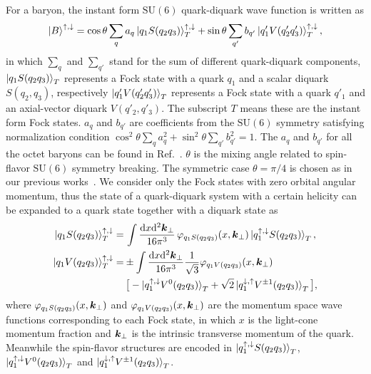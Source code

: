 \documentclass[aps,prc,preprint,groupedaddress,showpacs,superscriptaddress,floatfix]{revtex4-1}
\newcommand{\diff}{\ensuremath\mathrm{d}}
\renewcommand{\vec}[1]{\ensuremath\boldsymbol{#1}}
\newcommand{\udarrow}{\ensuremath{{\uparrow,\downarrow}}}
\newcommand{\duarrow}{\ensuremath{{\downarrow,\uparrow}}}
\begin{document}
For a baryon, the instant form $\mathrm{SU}(6)$ quark-diquark wave function is written as
%
\begin{equation}
  \Ket{B}^{\udarrow} = 
  \cos\theta \sum_q a_q \Ket{q_{1}S(q_{2}q_{3})}_T^{\udarrow}
  + \sin\theta \sum_{q'} b_{q'} \Ket{q'_{1}V(q'_{2}q'_{3})}_T^{\udarrow},
  \label{eq:quark_diquark}
\end{equation}
%
in which $\sum_q$ and $\sum_{q'}$ stand for the sum of different quark-diquark components, $\ket{q_1 S(q_2 q_3)}_T$ represents a Fock state with a quark $q_1$ and a scalar diquark $S(q_2, q_3)$, respectively $\ket{q'_1 V(q'_2 q'_3)}_T$ represents a Fock state with a quark $q'_1$ and an axial-vector diquark $V(q'_2, q'_3)$.
The subscript $T$ means these are the instant form Fock states.
$a_q$ and $b_{q'}$ are coefficients from the $\mathrm{SU}(6)$ symmetry satisfying normalization condition $\cos^2\theta \sum_q a_q^2 + \sin^2\theta \sum_{q'} b_{q'}^2 = 1$. 
The $a_q$ and $b_{q'}$ for all the octet baryons can be found in Ref.~\cite{lichtenberg_quark-diquark_1968}.
$\theta$ is the mixing angle related to spin-flavor $\mathrm{SU}(6)$ symmetry breaking.
The symmetric case $\theta=\pi/4$ is chosen as in our previous works~\cite{ma_x-dependent_1996,ma_quark_1998,ma_electromagnetic_2002,ma_axial_2002,liu_generalized_2014,lu_sivers_2004,liu_quark_2015}.
We consider only the Fock states with zero orbital angular momentum, thus the state of a quark-diquark system with a certain helicity can be expanded to a quark state together with a diquark state as
%
\begin{align}
  \ket{q_1 S(q_2 q_3)}_T^\udarrow =&\, 
  \int\frac{\diff x \diff^2 \vec{k}_{\perp}}{16\pi^3 }\,
  \varphi_{q_1 S(q_2 q_3)}(x, \vec{k}_\perp) \ket{q_1^\udarrow S(q_2 q_3)}_T,
  \label{eq:fock_expansion_1} \\
  \ket{q_1 V(q_2 q_3)}_T^\udarrow =&
  \pm \int\frac{\diff x \diff^2 \vec{k}_{\perp}}{16\pi^3}
  \frac{1}{\sqrt{3}} \varphi_{q_1 V(q_2 q_3)}(x, \vec{k}_\perp) \nonumber\\
  &\,\big[ - \ket{q_1^\udarrow V^0(q_2 q_3)}_T 
  + \sqrt{2} \ket{q_1^\duarrow V^{\pm 1}(q_2 q_3)}_T \big],
  \label{eq:fock_expansion_2}
\end{align}
%
where $\varphi_{q_1 S(q_2 q_3)}(x, \vec{k}_\perp)$ and $\varphi_{q_1 V(q_2 q_3)}(x, \vec{k}_\perp)$ are the momentum space wave functions corresponding to each Fock state, in which $x$ is the light-cone momentum fraction and $\vec{k}_\perp$ is the intrinsic transverse momentum of the quark.
Meanwhile the spin-flavor structures are encoded in $\ket{q_1^\udarrow S(q_2 q_3)}_T$, $\ket{q_1^\udarrow V^0(q_2 q_3)}_T$ and $\ket{q_1^\duarrow V^{\pm 1}(q_2 q_3)}_T$.
\end{document}

